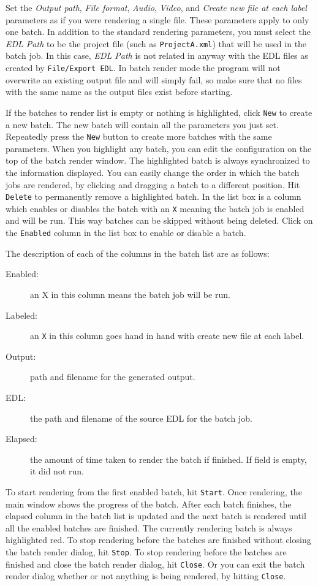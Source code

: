 Set the \textit{Output path}, \textit{File format}, \textit{Audio},
\textit{Video}, and \textit{Create new file at each label}
parameters as if you were rendering a single file.  These parameters
apply to only one batch.  In addition to the standard rendering
parameters, you must select the \textit{EDL Path} to be the project
file (such as \texttt{ProjectA.xml}) that will be used in the batch
job.  In this case, \textit{EDL Path} is not related in anyway with
the EDL files as created by \texttt{File/Export EDL}.  In batch
render mode the program will not overwrite an existing output file
and will simply fail, so make sure that no files with the same name
as the output files exist before starting.

If the batches to render list is empty or nothing is highlighted,
click \texttt{New} to create a new batch. The new batch will contain
all the parameters you just set.  Repeatedly press the \texttt{New}
button to create more batches with the same parameters.  When you
highlight any batch, you can edit the configuration on the top of
the batch render window. The highlighted batch is always
synchronized to the information displayed.  You can easily change
the order in which the batch jobs are rendered, by clicking and
dragging a batch to a different position.  Hit \texttt{Delete} to
permanently remove a highlighted batch. In the list box is a column
which enables or disables the batch with an \texttt{X} meaning the
batch job is enabled and will be run.  This way batches can be
skipped without being deleted.  Click on the \texttt{Enabled} column
in the list box to enable or disable a batch.

The description of each of the columns in the batch list are as
follows:

\begin{description}
\item[Enabled:] an X in this column means the batch job will be run.
\item[Labeled:] an \texttt{X} in this column goes hand in hand with
  create new file at each label.
\item[Output:] path and filename for the generated output.
\item[EDL:] the path and filename of the source EDL for the batch
  job.
\item[Elapsed:] the amount of time taken to render the batch if
  finished.  If field is empty, it did not run.
\end{description} To start rendering from the first enabled batch,
hit \texttt{Start}.  Once rendering, the main window shows the
progress of the batch. After each batch finishes, the elapsed column
in the batch list is updated and the next batch is rendered until
all the enabled batches are finished.  The currently rendering batch
is always highlighted red.  To stop rendering before the batches are
finished without closing the batch render dialog, hit \texttt{Stop}.
To stop rendering before the batches are finished and close the
batch render dialog, hit \texttt{Close}.  Or you can exit the batch
render dialog whether or not anything is being rendered, by hitting
\texttt{Close}.

